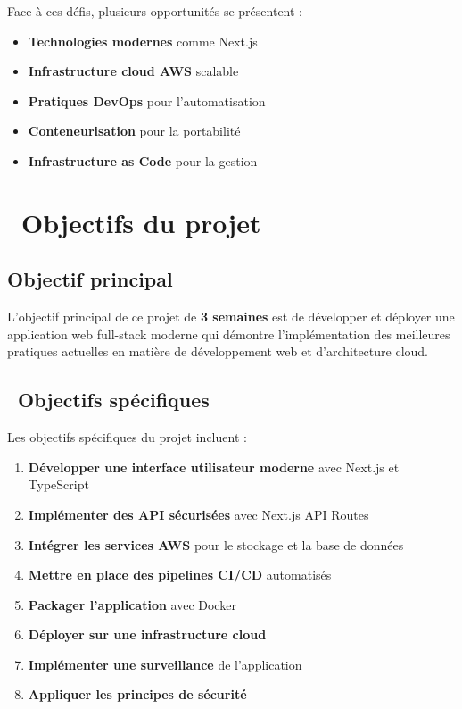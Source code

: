Face à ces défis, plusieurs opportunités se présentent :

\begin{itemize}
    \item \textcolor{accentgreen}{\textbf{Technologies modernes}} comme Next.js
    \item \textcolor{accentgreen}{\textbf{Infrastructure cloud AWS}} scalable
    \item \textcolor{accentgreen}{\textbf{Pratiques DevOps}} pour l'automatisation
    \item \textcolor{accentgreen}{\textbf{Conteneurisation}} pour la portabilité
    \item \textcolor{accentgreen}{\textbf{Infrastructure as Code}} pour la gestion
\end{itemize}

\section{\faTarget\ Objectifs du projet}

\subsection{Objectif principal}

\begin{infobox}
L'objectif principal de ce projet de \textbf{\color{primaryblue}3 semaines} est de développer et déployer une application web full-stack moderne qui démontre l'implémentation des meilleures pratiques actuelles en matière de développement web et d'architecture cloud.
\end{infobox}

\subsection{\faListOl\ Objectifs spécifiques}

Les objectifs spécifiques du projet incluent :

\begin{enumerate}
    \item \textcolor{primaryblue}{\textbf{Développer une interface utilisateur moderne}} avec Next.js et TypeScript
    \item \textcolor{primaryblue}{\textbf{Implémenter des API sécurisées}} avec Next.js API Routes
    \item \textcolor{primaryblue}{\textbf{Intégrer les services AWS}} pour le stockage et la base de données
    \item \textcolor{primaryblue}{\textbf{Mettre en place des pipelines CI/CD}} automatisés
    \item \textcolor{primaryblue}{\textbf{Packager l'application}} avec Docker
    \item \textcolor{primaryblue}{\textbf{Déployer sur une infrastructure cloud}}
    \item \textcolor{primaryblue}{\textbf{Implémenter une surveillance}} de l'application
    \item \textcolor{primaryblue}{\textbf{Appliquer les principes de sécurité}}
\end{enumerate}

